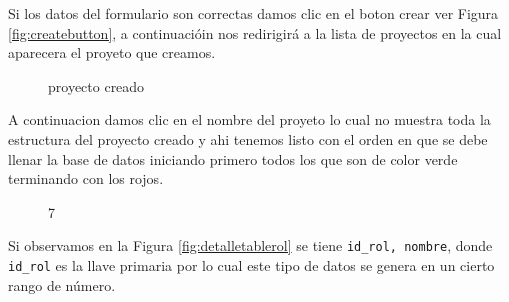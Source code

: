 Si los datos del formulario son correctas damos clic en el boton crear ver Figura \ref{fig:createbutton}, a continuaci\'oin nos redirigir\'a a la lista de proyectos en la cual aparecera el proyeto que creamos. 
\begin{figure}[H]
\caption{proyecto creado} \label{fig:viewprojectcreated}
\centering
{}
\end{figure}
A continuacion damos clic en el nombre del proyeto lo cual no muestra toda la estructura del proyecto creado y ahi tenemos listo con el orden en que se debe llenar la base de datos iniciando primero todos los que son de color verde terminando con los rojos.
\begin{figure}[H]
\caption{7}
\centering
{}
\end{figure}
Si observamos en la Figura \ref{fig:detalletablerol} se tiene \texttt{id\_rol, nombre}, donde \texttt{id\_rol} es la llave primaria por lo cual este tipo de datos se genera en un cierto rango de n\'umero.
